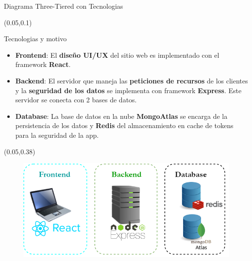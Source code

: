 \documentclass[xcolor=pdftex,dvipsnames,table]{beamer}
\begin{document}
\begin{frame}{Diagrama Three-Tiered con Tecnologias}
\small{

    \begin{textblock*}{0.9\textwidth}(0.05\textwidth,0.1\textwidth)
        \begin{block}{Tecnologias y motivo} 
                    \scriptsize  {
                    \justifying
                    \begin{itemize}
                      \setlength\itemsep{0.1em}
                        \item {\textbf{Frontend}: El \textbf{diseño UI/UX} del sitio web es implementado con el framework \textbf{React}.}
                        \item {\textbf{Backend}: El servidor que maneja las \textbf{peticiones de recursos} de los clientes y la \textbf{seguridad de los datos} se implementa con framework \textbf{Express}. Este servidor se conecta con 2 bases de datos.}
                        \item {\textbf{Database}: La base de datos en la nube \textbf{MongoAtlas} se encarga de la persistencia de los datos y \textbf{Redis} del almacenamiento en cache de tokens para la seguridad de la app.}
                    \end{itemize}}
            
        \end{block}
    \end{textblock*}
    
    \begin{textblock*}{0.9\textwidth}(0.05\textwidth,0.38\textwidth)
        \begin{figure}
            \centering
            \includegraphics[width=0.8\linewidth]{levels/2leves.png}
            \label{fig:my_label}
        \end{figure}
    \end{textblock*}
    
}
\end{frame}
\end{document}
